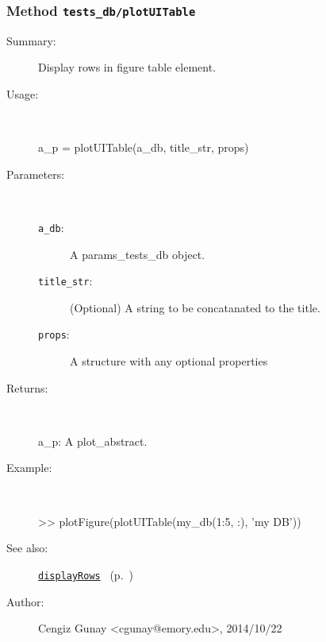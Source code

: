 \subsubsection[Method \texttt{plotUITable}]{Method \texttt{tests\_db/plotUITable}}%
%
\label{ref_tests_db__plotUITable}%
\hypertarget{ref_tests_db__plotUITable}{}%
\begin{description}
\item[Summary:]Display rows in figure table element.
%
\item[Usage:]~%
\begin{lyxcode}%
a\_p = plotUITable(a\_db, title\_str, props)
%
\end{lyxcode}%
%
%
\item[Parameters:]~
\begin{description}%
\item[\texttt{a\_db}:]
 A params\_tests\_db object.
\item[\texttt{title\_str}:]
 (Optional) A string to be concatanated to the title.
\item[\texttt{props}:]
 A structure with any optional properties
\end{description}%
%
\item[Returns:
]~

   a\_p: A plot\_abstract.
%
\item[Example:]~
\begin{lyxcode} >> plotFigure(plotUITable(my\_db(1:5, :), 'my DB'))
\\%
\end{lyxcode}
%
\item[See also:]%
\hyperlink{ref_displayRows}{\texttt{displayRows}}%
\ (p.~\pageref{ref_displayRows})%
%
%
\item[Author:]%
Cengiz Gunay <cgunay@emory.edu>, 2014/10/22
%
\end{description}
\methodline%
